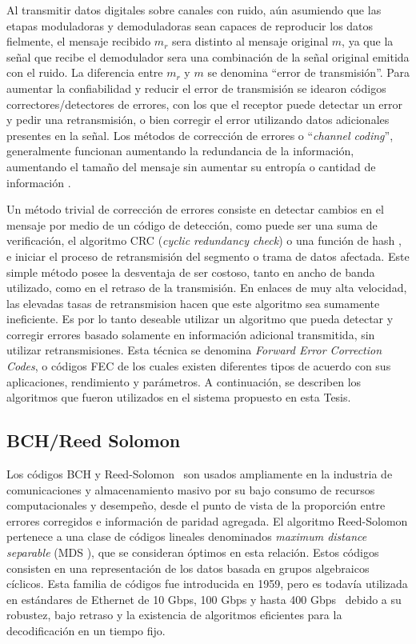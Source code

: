 Al transmitir datos digitales sobre canales con ruido, aún asumiendo que las etapas moduladoras y demoduladoras sean capaces de reproducir los datos fielmente, el mensaje recibido $m_r$ sera distinto al mensaje original $m$, ya que la señal que recibe el demodulador sera una combinación de la señal original emitida con el ruido. La diferencia entre $m_r$ y $m$ se denomina ``error de transmisión''. Para aumentar la confiabilidad y reducir el error de transmisión se idearon códigos correctores/detectores de errores, con los que el receptor puede detectar un error y pedir una retransmisión, o bien corregir el error utilizando datos adicionales presentes en la señal. Los métodos de corrección de errores o ``\textit{channel coding}'', generalmente funcionan aumentando la redundancia de la información, aumentando el tamaño del mensaje sin aumentar su entropía o cantidad de información \cite{Moon:05}.

Un método trivial de corrección de errores consiste en detectar cambios en el mensaje por medio de un código de detección, como puede ser una suma de verificación, el algoritmo CRC (\textit{cyclic redundancy check}) o una función de hash \cite{Menezes:1996:HAC:548089}, e iniciar el proceso de retransmisión del segmento o trama de datos afectada. Este simple método posee la desventaja de ser costoso, tanto en ancho de banda utilizado, como en el retraso de la transmisión. En enlaces de muy alta velocidad, las elevadas tasas de retransmision hacen que este algoritmo sea sumamente ineficiente. Es por lo tanto deseable utilizar un algoritmo que pueda detectar y corregir errores basado solamente en información adicional transmitida, sin utilizar retransmisiones. Esta técnica se denomina \textsl{Forward Error Correction Codes}, o códigos FEC \cite{Moon:05} de los cuales existen diferentes tipos de acuerdo con sus aplicaciones, rendimiento y parámetros. A continuación, se describen los algoritmos que fueron utilizados en el sistema propuesto en esta Tesis.

\subsection{BCH/Reed Solomon}
Los códigos BCH y Reed-Solomon~\cite{reed1960polynomial} son usados ampliamente en la industria de comunicaciones y almacenamiento masivo por su bajo consumo de recursos computacionales y desempeño, desde el punto de vista de la proporción entre errores corregidos e información de paridad agregada. El algoritmo Reed-Solomon pertenece a una clase de códigos lineales denominados \textit{maximum distance separable} (MDS ), que se consideran óptimos en esta relación. Estos códigos consisten en una representación de los datos basada en grupos algebraicos cíclicos.
Esta familia de códigos fue introducida en 1959, pero es todavía utilizada en estándares de Ethernet de 10 Gbps, 100 Gbps y hasta 400 Gbps~\cite{liforward} debido a su robustez, bajo retraso y la existencia de algoritmos eficientes para la decodificación en un tiempo fijo.

